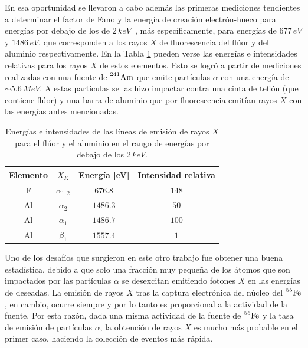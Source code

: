 En esa oportunidad se llevaron a cabo además las primeras mediciones tendientes a determinar el factor de Fano y la energía de creación electrón-hueco para energías por debajo de los de $2\,\si{keV}$~\cite{TesisKevin}, más específicamente, para energías de $677\,\si{eV}$ y $1486\,\si{eV}$, que corresponden a los rayos $X$ de fluorescencia del flúor y del aluminio respectivamente. En la Tabla \ref{tab:EnergiasFluorescenciaFAl} pueden verse las energías e intensidades relativas para los rayos $X$ de estos elementos. Esto se logró a partir de mediciones realizadas con una fuente de $\prescript{241}{}{\mbox{Am}}$ que emite partículas $\alpha$ con una energía de $\sim 5.6\,\si{MeV}$. A estas partículas se las hizo impactar contra una cinta de teflón (que contiene flúor) y una barra de aluminio que por fluorescencia emitían rayos $X$ con las energías antes mencionadas. 
\begin{table}[h]
\centering
\begin{tabular}{@{}cccc@{}}
\toprule
Elemento    &   $X_{K}$         &   Energía [eV]    &   Intensidad relativa \\ \hline \hline
F           &   $\alpha_{1,2}$  &   $676.8$         &   $148$               \\
Al          &   $\alpha_{2}$    &   $1486.3$        &   $50$                \\
Al          &   $\alpha_{1}$    &   $1486.7$        &   $100$               \\
Al          &   $\beta_{1}$     &   $1557.4$        &   $1$                 \\ \bottomrule
\end{tabular}
\caption{Energías e intensidades de las líneas de emisión de rayos $X$ para el flúor y el aluminio en el rango de energías por debajo de los $2\,\si{keV}$.}
\label{tab:EnergiasFluorescenciaFAl}
\end{table}

Uno de los desafíos que surgieron en este otro trabajo fue obtener una buena estadística, debido a que solo una fracción muy pequeña de los átomos que son impactados por las partículas $\alpha$ se desexcitan emitiendo fotones $X$ en las energías de deseadas. La emisión de rayos $X$ tras la captura electrónica del núcleo del $\prescript{55}{}{\mbox{Fe}}$, en cambio, ocurre siempre y por lo tanto es proporcional a la actividad de la fuente. Por esta razón, dada una misma actividad de la fuente de $\prescript{55}{}{\mbox{Fe}}$ y la tasa de emisión de partículas $\alpha$, la obtención de rayos $X$ es mucho más probable en el primer caso, haciendo la colección de eventos más rápida.

